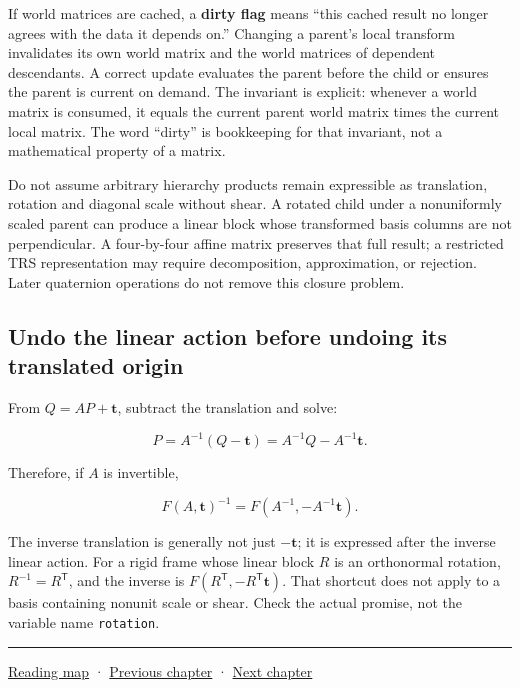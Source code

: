 If world matrices are cached, a \textbf{dirty flag} means ``this cached result no longer agrees with the data it depends on.'' Changing a parent's local transform invalidates its own world matrix and the world matrices of dependent descendants. A correct update evaluates the parent before the child or ensures the parent is current on demand. The invariant is explicit: whenever a world matrix is consumed, it equals the current parent world matrix times the current local matrix. The word ``dirty'' is bookkeeping for that invariant, not a mathematical property of a matrix.

Do not assume arbitrary hierarchy products remain expressible as translation, rotation and diagonal scale without shear. A rotated child under a nonuniformly scaled parent can produce a linear block whose transformed basis columns are not perpendicular. A four-by-four affine matrix preserves that full result; a restricted TRS representation may require decomposition, approximation, or rejection. Later quaternion operations do not remove this closure problem.

\subsection{Undo the linear action before undoing its translated origin}\label{01-foundations-i-ch018-undo-the-linear-action-before-undoing-its-translated-origin}

From \(Q=AP+\mathbf t\), subtract the translation and solve:

\[
P=A^{-1}(Q-\mathbf t)=A^{-1}Q-A^{-1}\mathbf t.
\]

Therefore, if \(A\) is invertible,

\[
F(A,\mathbf t)^{-1}
=F(A^{-1},-A^{-1}\mathbf t).
\]

The inverse translation is generally not just \(-\mathbf t\); it is expressed after the inverse linear action. For a rigid frame whose linear block \(R\) is an orthonormal rotation, \(R^{-1}=R^{\mathsf T}\), and the inverse is \(F(R^{\mathsf T},-R^{\mathsf T}\mathbf t)\). That shortcut does not apply to a basis containing nonunit scale or shear. Check the actual promise, not the variable name \texttt{rotation}.

\begin{center}\rule{0.5\linewidth}{0.5pt}\end{center}

\hyperref[volume-reading-map]{Reading map} · \hyperref[01-foundations-i-ch017-python-and-numerical-tools-for-graphics-systems]{Previous chapter} · \hyperref[01-foundations-i-ch019-coordinate-frames-and-linear-systems]{Next chapter}
